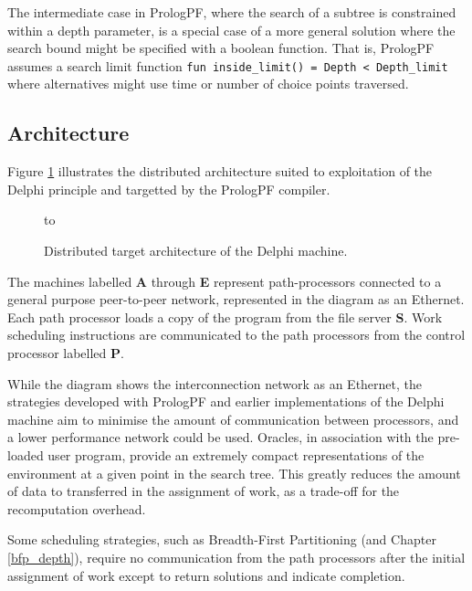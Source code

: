 The intermediate case in PrologPF, where the search of a subtree is constrained within
a depth parameter, is a special case of a more general solution where the search bound
might be specified with a boolean function.  That is, PrologPF assumes a search limit
function \texttt{fun inside\_{}limit() = Depth < Depth\_{}limit} where alternatives might
use time or number of choice points traversed.

\subsection{Architecture}

Figure \ref{architecture} illustrates the distributed architecture suited
to exploitation of the Delphi principle and targetted by the
PrologPF compiler.

\begin{figure}[h]
\vspace{5mm} \hbox to 
\caption{Distributed target architecture of the Delphi machine.}
\vspace{5mm}
\label{architecture}
\end{figure}

The machines labelled \textbf{A} through \textbf{E} represent path-processors connected to
a general purpose peer-to-peer network, represented in the diagram as an Ethernet.  Each
path processor loads a copy of the program from the file server \textbf{S}.  Work 
scheduling
instructions are communicated to the path processors from the control processor labelled
\textbf{P}.

While the diagram shows the interconnection network as an Ethernet, the strategies developed
with PrologPF and earlier implementations of the Delphi machine aim to minimise the
amount of communication between processors, and a lower performance network could be used.
Oracles, in association with the pre-loaded user program,
provide an extremely compact representations of the environment at a given point in the search
tree.  This greatly reduces the amount of data to transferred in the assignment of work,
as a trade-off for the recomputation overhead.

Some scheduling strategies, such as Breadth-First Partitioning \cite{Sar95} (and 
Chapter \ref{bfp_depth}), require no communication from the path processors after the
initial assignment of work except to return solutions and indicate completion.

